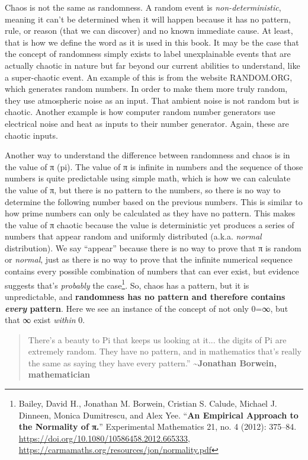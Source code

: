 \documentclass[
]{article}
\begin{document}
Chaos is not the same as randomness. A random event is
\emph{non-deterministic}, meaning it can't be determined when it will
happen because it has no pattern, rule, or reason (that we can discover)
and no known immediate cause. At least, that is how we define the word
as it is used in this book. It may be the case that the concept of
randomness simply exists to label unexplainable events that are actually
chaotic in nature but far beyond our current abilities to understand,
like a super-chaotic event. An example of this is from the website
RANDOM.ORG, which generates random numbers. In order to make them more
truly random, they use atmospheric noise as an input. That ambient noise
is not random but is chaotic. Another example is how computer random
number generators use electrical noise and heat as inputs to their
number generator. Again, these are chaotic inputs.

Another way to understand the difference between randomness and chaos is
in the value of π (pi). The value of π is infinite in numbers and the
sequence of those numbers is quite predictable using simple math, which
is how we can calculate the value of π, but there is no pattern to the
numbers, so there is no way to determine the following number based on
the previous numbers. This is similar to how prime numbers can only be
calculated as they have no pattern. This makes the value of π chaotic
because the value is deterministic yet produces a series of numbers that
appear random and uniformly distributed (a.k.a. \emph{normal}
distribution). We say ``appear'' because there is no way to prove that π
is random or \emph{normal}, just as there is no way to prove that the
infinite numerical sequence contains every possible combination of
numbers that can ever exist, but evidence suggests that's
\emph{probably} the case\footnote{Bailey, David H., Jonathan M. Borwein,
  Cristian S. Calude, Michael J. Dinneen, Monica Dumitrescu, and Alex
  Yee. ``\textbf{An Empirical Approach to the Normality of π.}''
  Experimental Mathematics 21, no. 4 (2012): 375--84.
  \url{https://doi.org/10.1080/10586458.2012.665333},
  \url{https://carmamaths.org/resources/jon/normality.pdf}}. So, chaos
has a pattern, but it is unpredictable, and \textbf{randomness has no
pattern and therefore contains \emph{every} pattern}. Here we see an
instance of the concept of not only 0=∞, but that ∞ exist \emph{within}
0.

\begin{quote}
There's a beauty to Pi that keeps us looking at it... the digits of Pi
are extremely random. They have no pattern, and in mathematics that's
really the same as saying they have every pattern.''
\textbf{\textasciitilde Jonathan Borwein, mathematician}
\end{quote}
\end{document}
